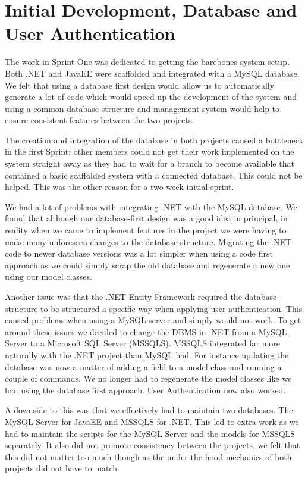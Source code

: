 \section{Initial Development, Database and User Authentication}
The work in Sprint One was dedicated to getting the barebones system setup. Both .NET and JavaEE were scaffolded and integrated with a MySQL database. We felt that using a database first design would allow us to automatically generate a lot of code which would speed up the development of the system and using a common database structure and management system would help to ensure consistent features between the two projects. \par
The creation and integration of the database in both projects caused a bottleneck in the first Sprint; other members could not get their work implemented on the system straight away as they had to wait for a branch to become available that contained a basic scaffolded system with a connected database. This could not be helped. This was the other reason for a two week initial sprint. \par
We had a lot of problems with integrating .NET with the MySQL database. We found that although our database-first design was a good idea in principal, in reality when we came to implement features in the project we were having to make many unforeseen changes to the database structure. Migrating the .NET code to newer database versions was a lot simpler when using a code first approach as we could simply scrap the old database and regenerate a new one using our model classes. \par
Another issue was that the .NET Entity Framework required the database structure to be structured a specific way when applying user authentication. This caused problems when using a MySQL server and simply would not work. To get around these issues we decided to change the DBMS in .NET from a MySQL Server to a Microsoft SQL Server (MSSQLS). MSSQLS integrated far more naturally with the .NET project than MySQL had. For instance updating the database was now a matter of adding a field to a model class and running a couple of commands. We no longer had to regenerate the model classes like we had using the database first approach. User Authentication now also worked. \par
A downside to this was that we effectively had to maintain two databases. The MySQL Server for JavaEE and MSSQLS for .NET. This led to extra work as we had to maintain the scripts for the MySQL Server and the models for MSSQLS separately. It also did not promote consistency between the projects, we felt that this did not matter too much though as the under-the-hood mechanics of both projects did not have to match. \par
